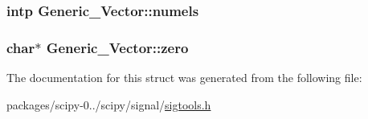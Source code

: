 \subsubsection[{numels}]{\setlength{\rightskip}{0pt plus 5cm}intp Generic\+\_\+\+Vector\+::numels}\label{structGeneric__Vector_a3f97134a1e97fed053d3924fb05cf8fa}
\hypertarget{structGeneric__Vector_acc1f8b354014503bbf0b66b59bb2c43a}{}
\subsubsection[{zero}]{\setlength{\rightskip}{0pt plus 5cm}char$\ast$ Generic\+\_\+\+Vector\+::zero}\label{structGeneric__Vector_acc1f8b354014503bbf0b66b59bb2c43a}


The documentation for this struct was generated from the following file\+:\begin{DoxyCompactItemize}
\item 
packages/scipy-\/0../scipy/signal/\hyperlink{sigtools_8h}{sigtools.\+h}\end{DoxyCompactItemize}
